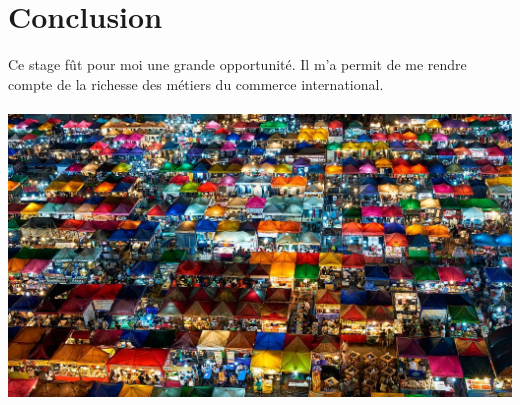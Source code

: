 \section*{Conclusion}
Ce stage fût pour moi une grande opportunité. Il m'a permit de me rendre compte de la richesse des métiers du commerce international.
\paragraph{}
\includegraphics[width=16cm]{image/marche.jpg}
